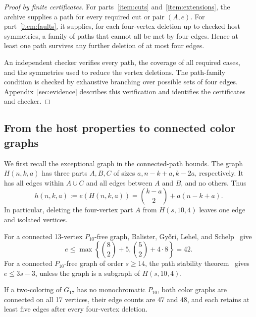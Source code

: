 \documentclass[12pt]{article}
\begin{document}
\begin{proof}[Proof by finite certificates]
For parts~\ref{item:cuts} and~\ref{item:extensions}, the archive
supplies a path for every required cut or pair $(A,e)$.
For part~\ref{item:faults}, it supplies, for each four-vertex
deletion up to checked host symmetries, a family of paths that
cannot all be met by four edges. Hence at least one path
survives any further deletion of at most four edges.

An independent checker verifies every path, the coverage of all
required cases, and the symmetries used to reduce the vertex
deletions. The path-family condition is checked by exhaustive
branching over possible sets of four edges.
Appendix~\ref{sec:evidence} describes this verification and
identifies the certificates and checker.
\end{proof}

\subsection{From the host properties to connected color graphs}

We first recall the exceptional graph in the connected-path
bounds. The graph $H(n,k,a)$ has three parts $A,B,C$ of sizes
$a,n-k+a,k-2a$, respectively. It has all edges within $A\cup C$
and all edges between $A$ and $B$, and no others. Thus
\begin{equation}\label{eq:h}
 h(n,k,a):=e(H(n,k,a))
 =\binom{k-a}{2}+a(n-k+a).
\end{equation}
In particular, deleting the four-vertex part $A$ from
$H(s,10,4)$ leaves one edge and isolated vertices.

For a connected 13-vertex $P_{10}$-free graph,
Balister, Gy\H{o}ri, Lehel, and Schelp~\cite[Theorem~1.3]{bgls}
give
\begin{equation}\label{eq:13bound}
 e\leq\max\left\{\binom82+5,\binom52+4\cdot8\right\}=42.
\end{equation}
For a connected $P_{10}$-free graph of order $s\geq14$,
the path stability theorem~\cite[Theorem~1.6]{fkv} gives
$e\leq3s-3$, unless the graph is a subgraph of $H(s,10,4)$.

\begin{proposition}\label{prop:reduction}
If a two-coloring of $G_{17}$ has no monochromatic $P_{10}$,
both color graphs are connected on all 17 vertices, their edge
counts are 47 and 48, and each retains at least five edges after
every four-vertex deletion.
\end{proposition}
\end{document}
